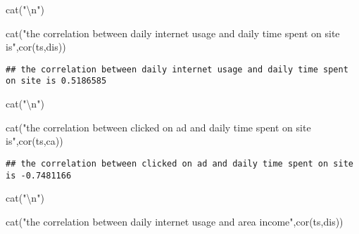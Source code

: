 \documentclass[
]{article}
\newenvironment{Shaded}{\begin{snugshade}}{\end{snugshade}}
\newcommand{\FunctionTok}[1]{\textcolor[rgb]{0.00,0.00,0.00}{#1}}
\newcommand{\NormalTok}[1]{#1}
\newcommand{\SpecialCharTok}[1]{\textcolor[rgb]{0.00,0.00,0.00}{#1}}
\newcommand{\StringTok}[1]{\textcolor[rgb]{0.31,0.60,0.02}{#1}}
\begin{document}
\begin{Shaded}
\begin{Highlighting}[]
\FunctionTok{cat}\NormalTok{(}\StringTok{"}\SpecialCharTok{\textbackslash{}n}\StringTok{"}\NormalTok{)}
\end{Highlighting}
\end{Shaded}

\begin{Shaded}
\begin{Highlighting}[]
\FunctionTok{cat}\NormalTok{(}\StringTok{"the correlation between daily internet usage and daily time spent on site is"}\NormalTok{,}\FunctionTok{cor}\NormalTok{(ts,dis))}
\end{Highlighting}
\end{Shaded}

\begin{verbatim}
## the correlation between daily internet usage and daily time spent on site is 0.5186585
\end{verbatim}

\begin{Shaded}
\begin{Highlighting}[]
\FunctionTok{cat}\NormalTok{(}\StringTok{"}\SpecialCharTok{\textbackslash{}n}\StringTok{"}\NormalTok{)}
\end{Highlighting}
\end{Shaded}

\begin{Shaded}
\begin{Highlighting}[]
\FunctionTok{cat}\NormalTok{(}\StringTok{"the correlation between clicked on ad and daily time spent on site is"}\NormalTok{,}\FunctionTok{cor}\NormalTok{(ts,ca))}
\end{Highlighting}
\end{Shaded}

\begin{verbatim}
## the correlation between clicked on ad and daily time spent on site is -0.7481166
\end{verbatim}

\begin{Shaded}
\begin{Highlighting}[]
\FunctionTok{cat}\NormalTok{(}\StringTok{"}\SpecialCharTok{\textbackslash{}n}\StringTok{"}\NormalTok{)}
\end{Highlighting}
\end{Shaded}

\begin{Shaded}
\begin{Highlighting}[]
\FunctionTok{cat}\NormalTok{(}\StringTok{"the correlation between daily internet usage and area income"}\NormalTok{,}\FunctionTok{cor}\NormalTok{(ts,dis))}
\end{Highlighting}
\end{Shaded}
\end{document}

